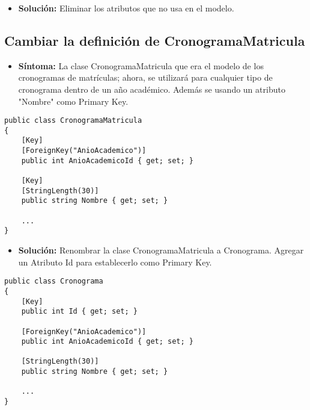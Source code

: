 \begin{itemize}
	\item \textbf{Solución:} Eliminar los atributos que no usa en el modelo.
\end{itemize}


\subsection{Cambiar la definición de CronogramaMatricula}
\begin{itemize}
	\item \textbf{Síntoma:} La clase CronogramaMatricula que era el modelo de los cronogramas de matrículas; ahora, se utilizará para cualquier tipo de cronograma dentro de un año académico. Además se usando un atributo "Nombre" como Primary Key.
\end{itemize}

\begin{lstlisting}[language={[Sharp]C}]
public class CronogramaMatricula
{
	[Key]
	[ForeignKey("AnioAcademico")]
	public int AnioAcademicoId { get; set; }
	
	[Key]
	[StringLength(30)]
	public string Nombre { get; set; }
	
	...
}
\end{lstlisting}

\begin{itemize}
	\item \textbf{Solución:} Renombrar la clase CronogramaMatricula a Cronograma. Agregar un Atributo Id para establecerlo como Primary Key.
\end{itemize}
\begin{lstlisting}[language={[Sharp]C}]
public class Cronograma
{
	[Key]
	public int Id { get; set; }

	[ForeignKey("AnioAcademico")]
	public int AnioAcademicoId { get; set; }
	
	[StringLength(30)]
	public string Nombre { get; set; }
	
	...
}
\end{lstlisting}